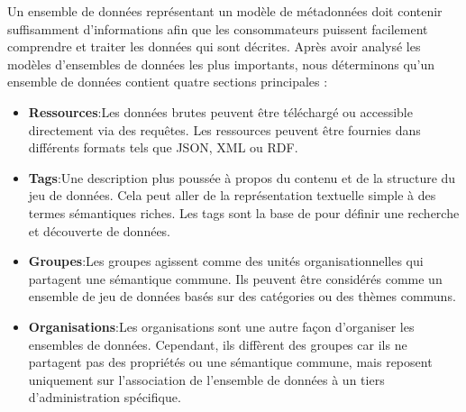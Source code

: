 Un ensemble de donn\'{e}es repr\'{e}sentant un mod\`{e}le de m\'{e}tadonn\'{e}es doit contenir suffisamment d'informations afin que les consommateurs puissent facilement comprendre et traiter les donn\'{e}es qui sont d\'{e}crites. Apr\`{e}s avoir analys\'{e} les mod\`{e}les d'ensembles de donn\'{e}es les plus importants, nous d\'{e}terminons qu'un ensemble de donn\'{e}es contient quatre sections principales :
\begin{itemize}
	\item \textbf{Ressources}:Les donn\'{e}es brutes peuvent \^{e}tre t\'{e}l\'{e}charg\'{e} ou accessible directement via des requ\^{e}tes. Les ressources peuvent \^{e}tre fournies dans diff\'{e}rents formats tels que JSON, XML ou RDF.
	\item \textbf{Tags}:Une description plus pouss\'{e}e \`{a} propos du contenu et de la structure du jeu de donn\'{e}es. Cela peut aller de la repr\'{e}sentation textuelle simple \`{a} des termes s\'{e}mantiques riches. Les tags sont la base de pour d\'{e}finir une recherche et d\'{e}couverte de donn\'{e}es.
	\item \textbf{Groupes}:Les groupes agissent comme des unit\'{e}s organisationnelles qui partagent une s\'{e}mantique commune. Ils peuvent \^{e}tre consid\'{e}r\'{e}s comme un ensemble de jeu de donn\'{e}es bas\'{e}s sur des cat\'{e}gories ou des th\`{e}mes communs.
	\item \textbf{Organisations}:Les organisations sont une autre façon d'organiser les ensembles de donn\'{e}es. Cependant, ils diff\`{e}rent des groupes car ils ne partagent pas des propri\'{e}t\'{e}s ou une s\'{e}mantique commune, mais reposent uniquement sur l'association de l'ensemble de donn\'{e}es \`{a} un tiers d'administration sp\'{e}cifique.
\end{itemize}

